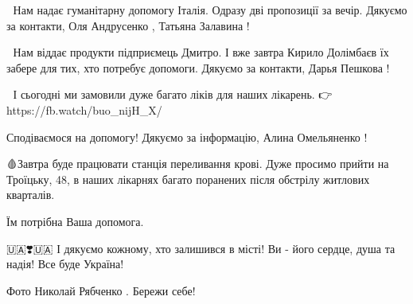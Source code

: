 🙂 Нам надає гуманітарну допомогу Італія. Одразу дві пропозиції за вечір.
Дякуємо за контакти, Оля Андрусенко , Татьяна Залавина !

🙂 Нам віддає продукти підприємець Дмитро. І вже завтра Кирило Долімбаєв їх
забере для тих, хто потребує допомоги. Дякуємо за контакти, Дарья Пешкова ! 

🙂 І сьогодні ми замовили дуже багато ліків для наших лікарень. 👉
https://fb.watch/buo_nijH_X/

Сподіваємося на допомогу! Дякуємо за інформацію, Алина Омельяненко !  

🩸Завтра буде працювати станція переливання крові. Дуже просимо прийти на
Троїцьку, 48, в наших лікарнях багато поранених після обстрілу житлових
кварталів.

Їм потрібна Ваша допомога.

🇺🇦❣️🇺🇦 І дякуємо кожному, хто залишився в місті! Ви - його сердце, душа та
надія! Все буде Україна! 

Фото Николай Рябченко . Бережи себе! 

